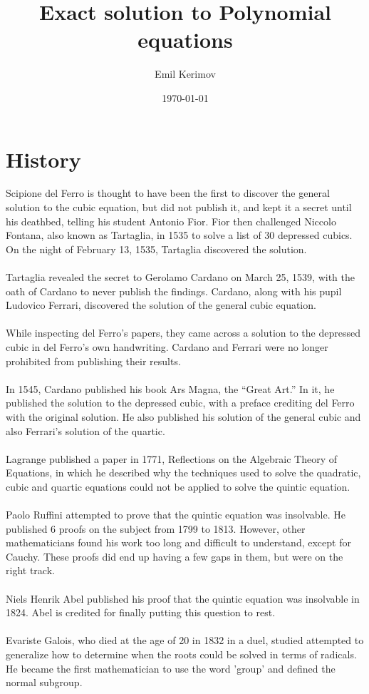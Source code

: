 \documentclass[a4paper]{article}
\title{Exact solution to Polynomial equations}
\author{Emil Kerimov}
\date{\today}
\begin{document}
\maketitle

\newtheorem{theorem}{Theorem}[section]
\newtheorem{corollary}{Corollary}[theorem]
\newtheorem{lemma}[theorem]{Lemma}
\newtheorem{definition}{Definition}[section]

\section{History}\label{sec:history}

Scipione del Ferro is thought to have been the first to discover the general solution to the cubic equation, but did not publish it, and kept it a secret until his deathbed, telling his student Antonio Fior.
Fior then challenged Niccolo Fontana, also known as Tartaglia, in 1535 to solve a list of 30 depressed cubics.
On the night of February 13, 1535, Tartaglia discovered the solution.
\\
\\
Tartaglia revealed the secret to
Gerolamo Cardano on March 25, 1539, with the oath
of Cardano to never publish the findings.
Cardano, along with his pupil Ludovico Ferrari, discovered the solution of the general cubic equation.
\\
\\
While inspecting del Ferro's papers, they
came across a solution to the depressed cubic in del Ferro's own handwriting.
Cardano and Ferrari were no longer prohibited from publishing their results.
\\
\\
In 1545, Cardano published his book Ars
Magna, the \textquotedblleft Great Art.\textquotedblright
In it, he published the solution to the
depressed cubic, with a preface crediting
del Ferro with the original solution.
He also published his solution of the
general cubic and also Ferrari's solution of
the quartic.
\\
\\
Lagrange published a paper in 1771, Reflections on the Algebraic Theory of Equations, in which he described why the techniques used to solve the quadratic, cubic and quartic equations could not be applied to solve the quintic equation. 
\\
\\
Paolo Ruffini attempted to prove that the quintic equation was insolvable.
He published 6 proofs on the subject from 1799 to 1813.
However, other mathematicians found his work too long and difficult to understand, except for Cauchy.
These proofs did end up having a few gaps in them, but were on the right track.
\\
\\
Niels Henrik Abel published his proof that the quintic equation was insolvable in 1824.
Abel is credited for finally putting this question to rest.
\\
\\
Evariste Galois, who died at the age of 20 in 1832 in a duel, studied attempted to generalize how to determine when the roots could be solved in terms of radicals.
He became the first mathematician to use the word 'group' and defined the normal subgroup.
\end{document}
